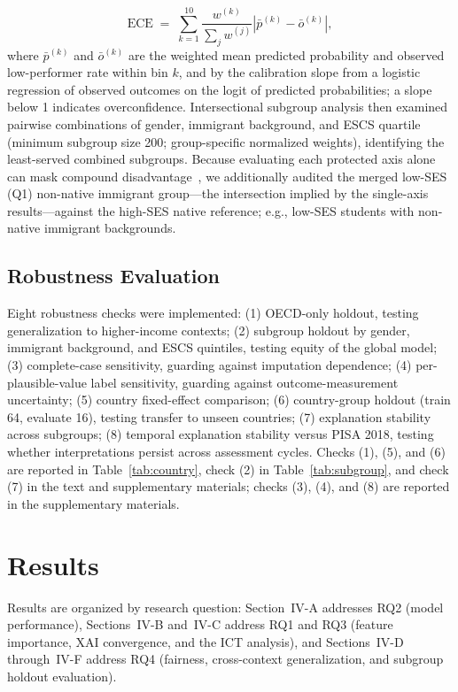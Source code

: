 \documentclass[journal]{IEEEtran}
\begin{document}
\begin{equation}
\mathrm{ECE} \;=\; \sum_{k=1}^{10} \frac{w^{(k)}}{\sum_j w^{(j)}} \left| \bar{p}^{(k)} - \bar{o}^{(k)} \right|,
\label{eq:ece}
\end{equation}
where $\bar{p}^{(k)}$ and $\bar{o}^{(k)}$ are the weighted mean predicted probability and observed low-performer rate within bin $k$, and by the calibration slope from a logistic regression of observed outcomes on the logit of predicted probabilities; a slope below 1 indicates overconfidence. Intersectional subgroup analysis then examined pairwise combinations of gender, immigrant background, and ESCS quartile (minimum subgroup size 200; group-specific normalized weights), identifying the least-served combined subgroups. Because evaluating each protected axis alone can mask compound disadvantage~\cite{Mirsch_2025_intersectional,pham2025fairness}, we additionally audited the merged low-SES (Q1) non-native immigrant group---the intersection implied by the single-axis results---against the high-SES native reference; e.g., low-SES students with non-native immigrant backgrounds.

\subsection{Robustness Evaluation}
Eight robustness checks were implemented: (1) OECD-only holdout, testing generalization to higher-income contexts; (2) subgroup holdout by gender, immigrant background, and ESCS quintiles, testing equity of the global model; (3) complete-case sensitivity, guarding against imputation dependence; (4) per-plausible-value label sensitivity, guarding against outcome-measurement uncertainty; (5) country fixed-effect comparison; (6) country-group holdout (train 64, evaluate 16), testing transfer to unseen countries; (7) explanation stability across subgroups; (8) temporal explanation stability versus PISA 2018, testing whether interpretations persist across assessment cycles. Checks (1), (5), and (6) are reported in Table~\ref{tab:country}, check (2) in Table~\ref{tab:subgroup}, and check (7) in the text and supplementary materials; checks (3), (4), and (8) are reported in the supplementary materials.

\section{Results}
Results are organized by research question: Section~IV-A addresses RQ2 (model performance), Sections~IV-B and~IV-C address RQ1 and RQ3 (feature importance, XAI convergence, and the ICT analysis), and Sections~IV-D through~IV-F address RQ4 (fairness, cross-context generalization, and subgroup holdout evaluation).
\end{document}
